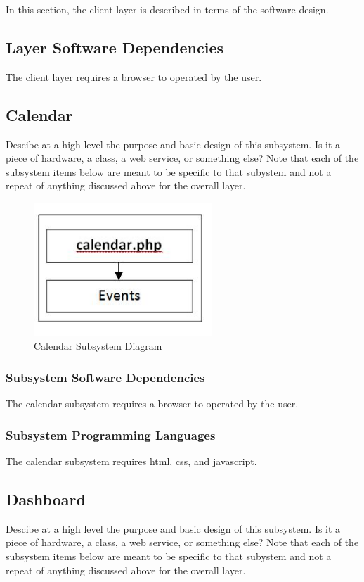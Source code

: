 In this section, the client layer is described in terms of the software design.


\subsection{Layer Software Dependencies}
The client layer requires a browser to operated by the user.

\subsection{Calendar}
Descibe at a high level the purpose and basic design of this subsystem. Is it a piece of hardware, a class, a web service, or something else? Note that each of the subsystem items below are meant to be specific to that subystem and not a repeat of anything discussed above for the overall layer.

\begin{figure}[h!]
	\centering
 	\includegraphics[width=0.60\textwidth]{images/calendar}
 \caption{Calendar Subsystem Diagram}
\end{figure}

\subsubsection{Subsystem Software Dependencies}
The calendar subsystem requires a browser to operated by the user.

\subsubsection{Subsystem Programming Languages}
The calendar subsystem requires html, css, and javascript.


\subsection{Dashboard}
Descibe at a high level the purpose and basic design of this subsystem. Is it a piece of hardware, a class, a web service, or something else? Note that each of the subsystem items below are meant to be specific to that subystem and not a repeat of anything discussed above for the overall layer.

